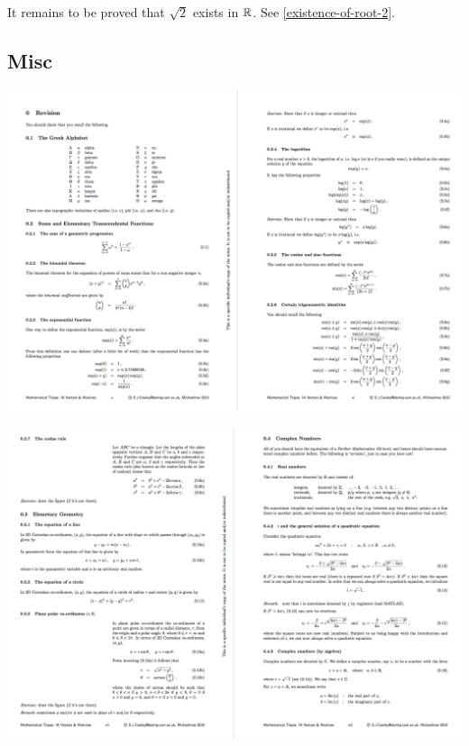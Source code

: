 \begin{remark*}
  It remains to be proved that $\sqrt{2}$ exists in $\mathbb{R}$. See \ref{existence-of-root-2}.
\end{remark*}

\subsection{Misc}
\begin{mdframed}
\includegraphics[width=400pt]{img/misc--cambridge-1a-vectors-and-matrices-revision-1.png}
\end{mdframed}
\begin{mdframed}
\includegraphics[width=400pt]{img/misc--cambridge-1a-vectors-and-matrices-revision-2.png}
\end{mdframed}
